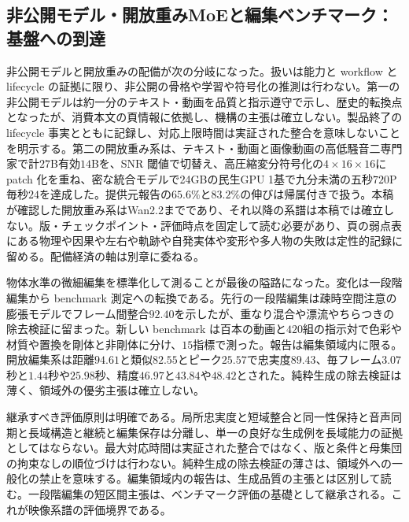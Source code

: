 \documentclass[lualatex,a4paper,10pt]{jlreq}
\begin{document}
\subsection{非公開モデル・開放重みMoEと編集ベンチマーク：基盤への到達}
非公開モデルと開放重みの配備が次の分岐になった\autocite{btd077,btd124}。扱いは能力と workflow と lifecycle の証拠に限り、非公開の骨格や学習や符号化の推測は行わない\autocite{btd077}。第一の非公開モデルは約一分のテキスト・動画を品質と指示遵守で示し、歴史的転換点となったが、消費本文の頁情報に依拠し、機構の主張は確立しない\autocite{btd077}。製品終了の lifecycle 事実とともに記録し、対応上限時間は実証された整合を意味しないことを明示する\autocite{btd077}。第二の開放重み系は、テキスト・動画と画像動画の高低騒音二専門家で計$27$B有効$14$Bを、SNR 閾値で切替え、高圧縮変分符号化の$4 \times 16 \times 16$に patch 化を重ね、密な統合モデルで24GBの民生GPU 1基で九分未満の五秒$720$P毎秒$24$を達成した\autocite{btd124}。提供元報告の$65.6\%$と$83.2\%$の伸びは帰属付きで扱う\autocite{btd124}。本稿が確認した開放重み系はWan2.2までであり、それ以降の系譜は本稿では確立しない\autocite{btd124}。版・チェックポイント・評価時点を固定して読む必要があり、頁の弱点表にある物理や因果や左右や軌跡や自発実体や変形や多人物の失敗は定性的記録に留める\autocite{btd124}。配備経済の軸は別章に委ねる\autocite{btd124}。

物体水準の微細編集を標準化して測ることが最後の隘路になった\autocite{btd138}。変化は一段階編集から benchmark 測定への転換である\autocite{btd138}。先行の一段階編集は疎時空間注意の膨張モデルでフレーム間整合$92.40$を示したが、重なり混合や漂流やちらつきの除去検証に留まった\autocite{btd138}。新しい benchmark は百本の動画と$420$組の指示対で色彩や材質や置換を剛体と非剛体に分け、$15$指標で測った\autocite{btd138}。報告は編集領域内に限る\autocite{btd138}。開放編集系は距離$94.61$と類似$82.55$とピーク$25.57$で忠実度$89.43$、毎フレーム$3.07$秒と$1.44$秒や$25.98$秒、精度$46.97$と$43.84$や$48.42$とされた\autocite{btd138}。純粋生成の除去検証は薄く、領域外の優劣主張は確立しない\autocite{btd138}。

継承すべき評価原則は明確である。局所忠実度と短域整合と同一性保持と音声同期と長域構造と継続と編集保存は分離し、単一の良好な生成例を長域能力の証拠としてはならない\autocite{btd138}。最大対応時間は実証された整合ではなく、版と条件と母集団の拘束なしの順位づけは行わない\autocite{btd138}。純粋生成の除去検証の薄さは、領域外への一般化の禁止を意味する\autocite{btd138}。編集領域内の報告は、生成品質の主張とは区別して読む\autocite{btd138}。一段階編集の短区間主張は、ベンチマーク評価の基礎として継承される\autocite{btd138}。これが映像系譜の評価境界である\autocite{btd138}。
\end{document}
